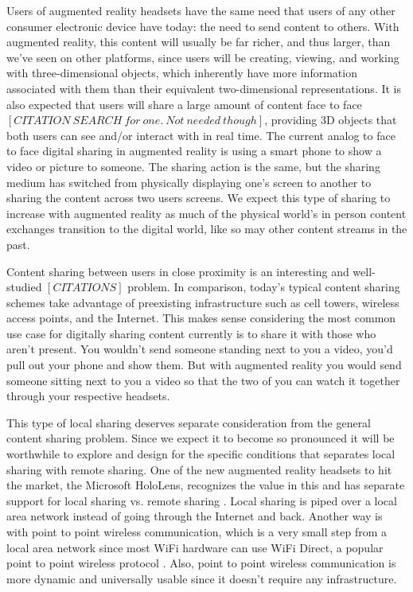 \documentclass[12pt]{report}
\begin{document}
Users of augmented reality headsets have the same need that users of any other consumer electronic device have today: the need to send content to others. With augmented reality, this content will usually be far richer, and thus larger, than we've seen on other platforms, since users will be creating, viewing, and working with three-dimensional objects, which inherently have more information associated with them than their equivalent two-dimensional representations. It is also expected that users will share a large amount of content face to face $[CITATION \: SEARCH \: for \: one. \: Not \: needed \: though]$, providing 3D objects that both users can see and/or interact with in real time. The current analog to face to face digital sharing in augmented reality is using a smart phone to show a video or picture to someone. The sharing action is the same, but the sharing medium has switched from physically displaying one's screen to another to sharing the content across two users screens. We expect this type of sharing to increase with augmented reality as much of the physical world's in person content exchanges transition to the digital world, like so may other content streams in the past. \par

Content sharing between users in close proximity is an interesting and well-studied $[CITATIONS]$ problem. In comparison, today's typical content sharing schemes take advantage of preexisting infrastructure such as cell towers, wireless access points, and the Internet. This makes sense considering the most common use case for digitally sharing content currently is to share it with those who aren't present. You wouldn't send someone standing next to you a video, you'd pull out your phone and show them. But with augmented reality you would send someone sitting next to you a video so that the two of you can watch it together through your respective headsets. \par

This type of local sharing deserves separate consideration from the general content sharing problem. Since we expect it to become so pronounced it will be worthwhile to explore and design for the specific conditions that separates local sharing with remote sharing. One of the new augmented reality headsets to hit the market, the Microsoft HoloLens, recognizes the value in this and has separate support for local sharing vs. remote sharing \cite{HoloLensSharingLocalNetwork2016}. Local sharing is piped over a local area network instead of going through the Internet and back. Another way is with point to point wireless communication, which is a very small step from a local area network since most WiFi hardware can use WiFi Direct, a popular point to point wireless protocol \cite{WiFiDirectP2p2014}. Also, point to point wireless communication is more dynamic and universally usable since it doesn't require any infrastructure. \par
\end{document}
